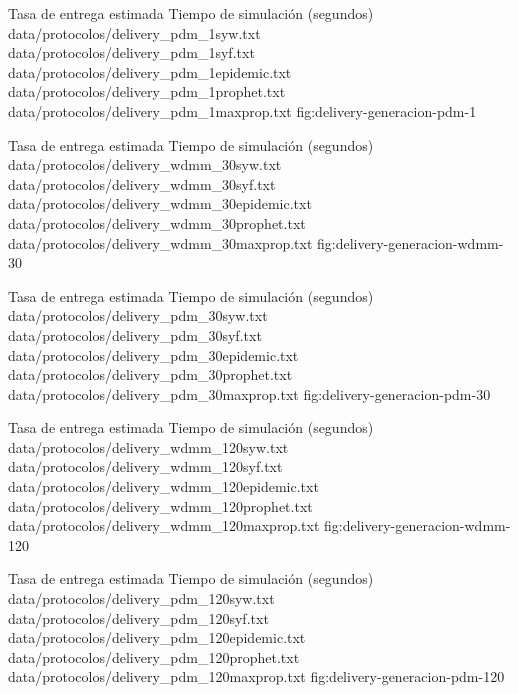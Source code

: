 {
\graficoEstimacio
{Tasa de entrega estimada}
{Tiempo de simulación (segundos)}
{data/protocolos/delivery_pdm_1syw.txt}
{data/protocolos/delivery_pdm_1syf.txt}
{data/protocolos/delivery_pdm_1epidemic.txt}
{data/protocolos/delivery_pdm_1prophet.txt}
{data/protocolos/delivery_pdm_1maxprop.txt}
}{fig:delivery-generacion-pdm-1}


{
\graficoEstimacio
{Tasa de entrega estimada}
{Tiempo de simulación (segundos)}
{data/protocolos/delivery_wdmm_30syw.txt}
{data/protocolos/delivery_wdmm_30syf.txt}
{data/protocolos/delivery_wdmm_30epidemic.txt}
{data/protocolos/delivery_wdmm_30prophet.txt}
{data/protocolos/delivery_wdmm_30maxprop.txt}
}{fig:delivery-generacion-wdmm-30}


{
\graficoEstimacio
{Tasa de entrega estimada}
{Tiempo de simulación (segundos)}
{data/protocolos/delivery_pdm_30syw.txt}
{data/protocolos/delivery_pdm_30syf.txt}
{data/protocolos/delivery_pdm_30epidemic.txt}
{data/protocolos/delivery_pdm_30prophet.txt}
{data/protocolos/delivery_pdm_30maxprop.txt}
}{fig:delivery-generacion-pdm-30}


{
\graficoEstimacio
{Tasa de entrega estimada}
{Tiempo de simulación (segundos)}
{data/protocolos/delivery_wdmm_120syw.txt}
{data/protocolos/delivery_wdmm_120syf.txt}
{data/protocolos/delivery_wdmm_120epidemic.txt}
{data/protocolos/delivery_wdmm_120prophet.txt}
{data/protocolos/delivery_wdmm_120maxprop.txt}
}{fig:delivery-generacion-wdmm-120}

{
\graficoEstimacio
{Tasa de entrega estimada}
{Tiempo de simulación (segundos)}
{data/protocolos/delivery_pdm_120syw.txt}
{data/protocolos/delivery_pdm_120syf.txt}
{data/protocolos/delivery_pdm_120epidemic.txt}
{data/protocolos/delivery_pdm_120prophet.txt}
{data/protocolos/delivery_pdm_120maxprop.txt}
}{fig:delivery-generacion-pdm-120}


